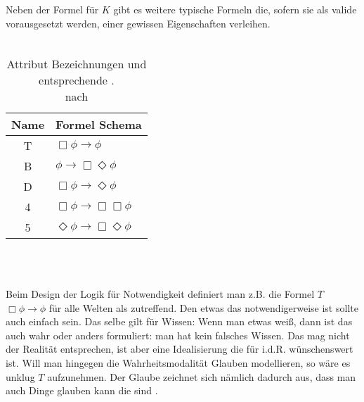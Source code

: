Neben der Formel für $K$ gibt es weitere typische Formeln die, sofern sie als valide vorausgesetzt werden, einer \ML gewissen Eigenschaften verleihen.\\
\\
\begin{table}
	\label{tab:attributes}
	\centering
	\begin{tabular}{cl}
	\hline
	\hline
	Name & Formel Schema\\
	\hline
	T & $\Box \phi \rightarrow \phi$\\
	B & $\phi \rightarrow \Box \Diamond\phi$\\
	D & $\Box \phi \rightarrow \Diamond \phi$\\
	4 & $\Box \phi \rightarrow \Box \Box \phi$\\
	5 & $\Diamond \phi \rightarrow \Box \Diamond \phi$\\
	\hline
	\end{tabular}\\
	\caption{Attribut Bezeichnungen und entsprechende \formelSchemata. \\
	nach }
\end{table}
\\
Beim Design der Logik für Notwendigkeit definiert man z.B. die Formel $T$ $\Box \phi \rightarrow \phi$ für alle Welten als zutreffend.
Den etwas das notwendigerweise \true ist sollte auch einfach \true sein.
Das selbe gilt für Wissen: Wenn man etwas weiß, dann ist das auch wahr oder anders formuliert: man hat kein falsches Wissen.
Das mag nicht der Realität entsprechen, ist aber eine Idealisierung die für \MAS i.d.R. wünschenswert ist.
Will man hingegen die Wahrheitsmodalität Glauben modellieren, so wäre es unklug $T$ aufzunehmen.
Der Glaube zeichnet sich nämlich dadurch aus, dass man auch Dinge glauben kann die \false sind .

